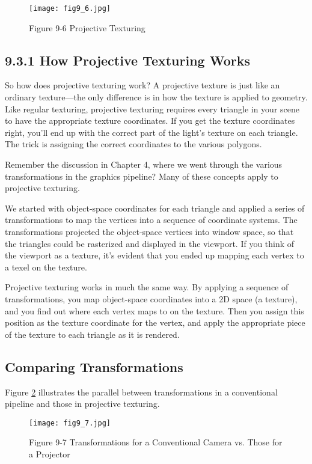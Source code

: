 \documentclass[../main.tex]{subfiles}
\begin{document}
\begin{figure}
    \centering
    \texttt{[image: fig9\_6.jpg]}
    \caption{Figure 9-6 Projective Texturing}
    \label{fig:9-6}
\end{figure}

\subsection{9.3.1 How Projective Texturing Works}

So how does projective texturing work? A projective texture is just like an ordinary texture—the only difference is in how the texture is applied to geometry. Like regular texturing, projective texturing requires every triangle in your scene to have the appropriate texture coordinates. If you get the texture coordinates right, you'll end up with the correct part of the light's texture on each triangle. The trick is assigning the correct coordinates to the various polygons.

Remember the discussion in Chapter 4, where we went through the various transformations in the graphics pipeline? Many of these concepts apply to projective texturing.

We started with object-space coordinates for each triangle and applied a series of transformations to map the vertices into a sequence of coordinate systems. The transformations projected the object-space vertices into window space, so that the triangles could be rasterized and displayed in the viewport. If you think of the viewport as a texture, it's evident that you ended up mapping each vertex to a texel on the texture.

Projective texturing works in much the same way. By applying a sequence of transformations, you map object-space coordinates into a 2D space (a texture), and you find out where each vertex maps to on the texture. Then you assign this position as the texture coordinate for the vertex, and apply the appropriate piece of the texture to each triangle as it is rendered.

\subsection*{Comparing Transformations}

Figure \ref{fig:9-7} illustrates the parallel between transformations in a conventional pipeline and those in projective texturing.

\begin{figure}
    \centering
    \texttt{[image: fig9\_7.jpg]}
    \caption{Figure 9-7 Transformations for a Conventional Camera vs. Those for a Projector}
    \label{fig:9-7}
\end{figure}
\end{document}
